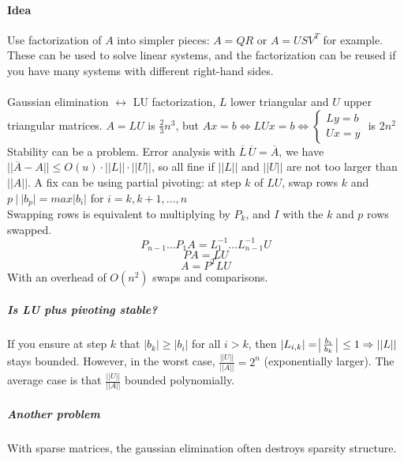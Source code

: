 \documentclass[10pt]{report}
\begin{document}
\paragraph{Idea} Use factorization of $A$ into simpler pieces: $A=QR$ or $A=USV^T$ for example. These can be used to solve linear systems, and the factorization can be reused if you have many systems with different right-hand sides.\\\\
Gaussian elimination $\leftrightarrow$ LU factorization, $L$ lower triangular and $U$ upper triangular matrices. $A = LU$ is $\frac{2}{3}n^3$, but $Ax=b\Leftrightarrow LUx = b\Leftrightarrow\left\{\begin{array}{l}
Ly=b\\Ux=y
\end{array}\right.$ is $2n^2$\\
Stability can be a problem. Error analysis with $\overline{L}\,\overline{U} = \overline{A}$, we have $||\overline{A}-A||\leq O(u)\cdot||L||\cdot||U||$, so all fine if $||L||$ and $||U||$ are not too larger than $||A||$. A fix can be using partial pivoting: at step $k$ of $LU$, swap rows $k$ and $p\:|\:|b_p|=max|b_i|$ for $i=k,k+1,\ldots,n$\\
Swapping rows is equivalent to multiplying by $P_k$, and $I$ with the $k$ and $p$ rows swapped.
$$P_{n-1}\ldots P_1A=L_1^{-1}\ldots L_{n-1}^{-1}U$$
$$PA = LU$$
$$A = P^TLU$$
With an overhead of $O(n^2)$ swaps and comparisons.
\subparagraph{Is LU plus pivoting stable?} If you ensure at step $k$ that $|b_k|\geq |b_i|$ for all $i>k$, then $|L_{i,k}| = \:\vline\frac{b_i}{b_k}\:\vline\:\leq 1 \Rightarrow ||L||$ stays bounded. However, in the worst case, $\frac{||U||}{||A||} = 2^n$ (exponentially larger). The average case is that $\frac{||U||}{||A||}$ bounded polynomially.
\subparagraph{Another problem} With sparse matrices, the gaussian elimination often destroys sparsity structure.
\end{document}
